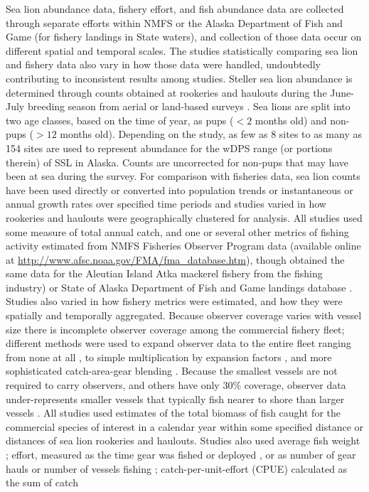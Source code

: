 \documentclass[11pt]{article}
\begin{document}
Sea lion abundance data, fishery effort, and fish abundance data are collected through separate efforts within NMFS or the Alaska Department of Fish and Game (for fishery landings in State waters), and collection of those data occur on different spatial and temporal scales. The studies statistically comparing sea lion and fishery data also vary in how those data were handled, undoubtedly contributing to inconsistent results among studies. Steller sea lion abundance is determined through counts obtained at rookeries and haulouts during the June-July breeding season from aerial or land-based surveys \citep{FritzEtAl2013}. Sea lions are split into two age classes, based on the time of year, as pups ($<2$ months old) and non-pups ($>12$ months old). Depending on the study, as few as 8 sites \citep{Loughlin:1989kl} to as many as 154 sites \citep[though combined into 10 sub-areas;][]{afsc:2010dz} are used to represent abundance for the wDPS range (or portions therein) of SSL in Alaska. Counts are uncorrected for non-pups that may have been at sea during the survey. For comparison with fisheries data, sea lion counts have been used directly \citep{Ferrero:1994hc,Sampson:1995cr,Soboleff:2006fk,Trites:2010ly} or converted into population trends or instantaneous or annual growth rates over specified time periods \citep{Loughlin:1989kl,Sampson:1995cr,Hennen:2006bs,Dillingham:2006fv,Calkins:2008ve,afsc:2010dz,Trites:2010ly,Hui:2011uq} and studies varied in how rookeries and haulouts were geographically clustered for analysis. All studies used some measure of total annual catch, and one or several other metrics of fishing activity estimated from NMFS Fisheries Observer Program data (available online at \url{http://www.afsc.noaa.gov/FMA/fma_database.htm}), though \citet{Trites:2010ly} obtained the same data for the Aleutian Island Atka mackerel fishery from the fishing industry) or State of Alaska Department of Fish and Game landings database \citep{Soboleff:2006fk}. Studies also varied in how fishery metrics were estimated, and how they were spatially and temporally aggregated. Because observer coverage varies with vessel size there is incomplete observer coverage among the commercial fishery fleet; different methods were used to expand observer data to the entire fleet ranging from none at all \citep{Hui:2011uq}, to simple multiplication by expansion factors \citep[e.g.,][]{Dillingham:2006fv,Hennen:2006bs,Calkins:2008ve}, and more sophisticated catch-area-gear blending \citep{afsc:2010dz}. Because the smallest vessels are not required to carry observers, and others have only 30\% coverage, observer data under-represents smaller vessels that typically fish nearer to shore than larger vessels \citep{afsc:2010dz}. All studies used estimates of the total biomass of fish caught for the commercial species of interest in a calendar year within some specified distance or distances of sea lion rookeries and haulouts. Studies also used average fish weight \citep{Loughlin:1989kl}; effort, measured as the time gear was fished or deployed \citep{Sampson:1995cr,Hennen:2006bs,Dillingham:2006fv,Calkins:2008ve}, or as number of gear hauls \citep{Hennen:2006bs,Calkins:2008ve,Trites:2010ly} or number of vessels fishing \citep{Soboleff:2006fk}; catch-per-unit-effort (CPUE) calculated as the sum of catch 
\end{document}
